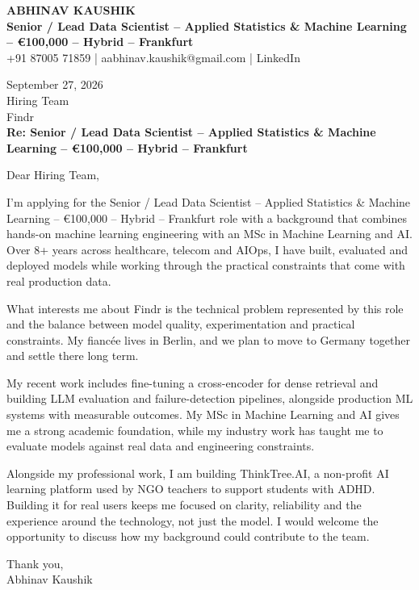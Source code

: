 \documentclass[10pt,a4paper]{article}
\begin{document}
\begin{center}
{\Large\bfseries ABHINAV KAUSHIK}\\[2pt]
{\bfseries Senior / Lead Data Scientist – Applied Statistics \& Machine Learning – €100,000 – Hybrid – Frankfurt}\\[2pt]
+91 87005 71859 \quad | \quad aabhinav.kaushik@gmail.com \quad | \quad LinkedIn
\end{center}
\vspace{8pt}
September 27, 2026\\[6pt]
Hiring Team\\
Findr\\[4pt]
\textbf{Re: Senior / Lead Data Scientist – Applied Statistics \& Machine Learning – €100,000 – Hybrid – Frankfurt}

Dear Hiring Team,

I’m applying for the Senior / Lead Data Scientist – Applied Statistics \& Machine Learning – €100,000 – Hybrid – Frankfurt role with a background that combines hands-on machine learning engineering with an MSc in Machine Learning and AI. Over 8+ years across healthcare, telecom and AIOps, I have built, evaluated and deployed models while working through the practical constraints that come with real production data.

What interests me about Findr is the technical problem represented by this role and the balance between model quality, experimentation and practical constraints. My fiancée lives in Berlin, and we plan to move to Germany together and settle there long term.

My recent work includes fine-tuning a cross-encoder for dense retrieval and building LLM evaluation and failure-detection pipelines, alongside production ML systems with measurable outcomes. My MSc in Machine Learning and AI gives me a strong academic foundation, while my industry work has taught me to evaluate models against real data and engineering constraints.

Alongside my professional work, I am building ThinkTree.AI, a non-profit AI learning platform used by NGO teachers to support students with ADHD. Building it for real users keeps me focused on clarity, reliability and the experience around the technology, not just the model. I would welcome the opportunity to discuss how my background could contribute to the team.

Thank you,\\
Abhinav Kaushik
\end{document}
